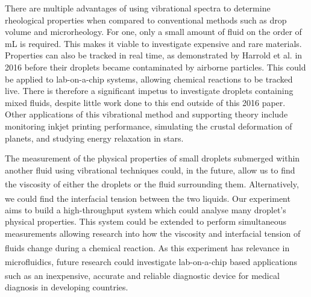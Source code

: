 \documentclass{physics_article_B}
\begin{document}
There are multiple advantages of using vibrational spectra to determine rheological properties when compared to conventional methods such as drop volume and microrheology. For one, only a small amount of fluid on the order of mL\cite{temperton} is required. This makes it viable to investigate expensive and rare materials. Properties can also be tracked in real time, as demonstrated by Harrold et al. in 2016\cite{harrold} before their droplets became contaminated by airborne particles. This could be applied to lab-on-a-chip systems, allowing chemical reactions to be tracked live. There is therefore a significant impetus to investigate droplets containing mixed fluids, despite little work done to this end outside of this 2016 paper. Other applications of this vibrational method and supporting theory include monitoring inkjet printing performance\cite{Martin2008}, simulating the crustal deformation of planets\cite{vukasinovic}, and studying energy relaxation in stars\cite{vukasinovic}.

The measurement of the physical properties of small droplets submerged within another fluid using vibrational techniques could, in the future, allow us to find the viscosity of either the droplets or the fluid surrounding them\textsuperscript{\cite{Backholm2017}}. Alternatively, we could find the interfacial tension between the two liquids\textsuperscript{\cite{Backholm2017}}. Our experiment aims to build a high-throughput system which could analyse many droplet's physical properties. This system could be extended to perform simultaneous measurements allowing research into how the viscosity and interfacial tension of fluids change during a chemical reaction\textsuperscript{\cite{Backholm2017}}. As this experiment has relevance in microfluidics, future research could investigate lab-on-a-chip based applications\textsuperscript{\cite{Temperton2012}} such as an inexpensive, accurate and reliable diagnostic device\textsuperscript{\cite{yager}} for medical diagnosis in developing countries.
\end{document}
